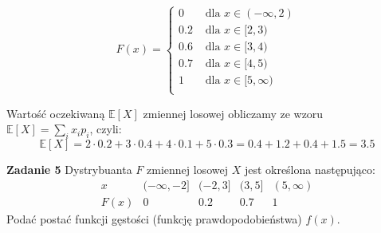 \documentclass[a4paper,12pt]{article}
\begin{document}
\begin{minipage}{0.35\textwidth}
\[
    F(x) = \begin{cases}
        0   & \text{ dla } x \in (-\infty, 2) \\
        0.2 & \text{ dla } x \in [2, 3) \\
        0.6 & \text{ dla } x \in [3, 4) \\
        0.7 & \text{ dla } x \in [4, 5) \\
        1   & \text{ dla } x \in [5, \infty) \\
    \end{cases}  
\]
\end{minipage}%
\begin{minipage}{0.65\textwidth}
\begin{center}
\end{center}
\end{minipage}

\noindent Wartość oczekiwaną $\mathbb{E}[X]$ zmiennej losowej obliczamy 
ze wzoru $\mathbb{E}[X] = \sum\limits_{i} x_i p_i$, czyli:
\[
    \mathbb{E}[X] = 2 \cdot 0.2 + 3 \cdot 0.4 + 4 \cdot 0.1 + 5 \cdot 0.3 =
        0.4 + 1.2 + 0.4 + 1.5 = 3.5
\]  

\newpage
\noindent \textbf{Zadanie 5} \newline
Dystrybuanta $F$ zmiennej losowej $X$ jest określona następująco:
\[
    \begin{matrix*}
        x       &   (-\infty, -2]   &   (-2, 3] &   (3, 5]  &   (5, \infty)   \\
        F(x)    &   0               &   0.2     &   0.7     &   1  
    \end{matrix*}
\]
\noindent Podać postać funkcji gęstości (funkcję prawdopodobieństwa) $f(x)$. \\
\end{document}
